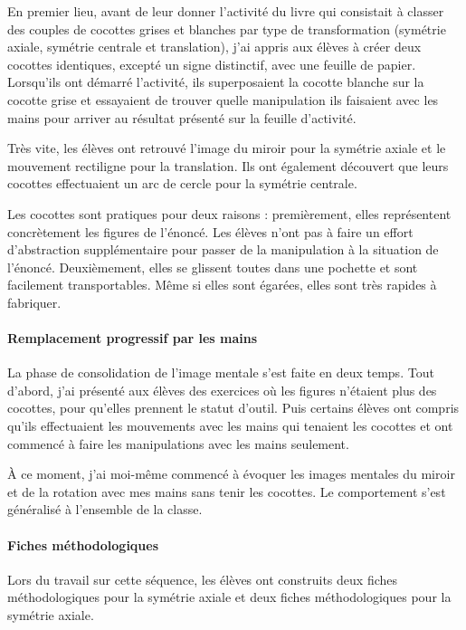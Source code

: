 En premier lieu, avant de leur donner l'activité du livre qui consistait à classer des couples de cocottes grises et blanches par type de transformation (symétrie axiale, symétrie centrale et translation), j'ai appris aux élèves à créer deux cocottes identiques, excepté un signe distinctif, avec une feuille de papier. Lorsqu'ils ont démarré l'activité, ils superposaient la cocotte blanche sur la cocotte grise et essayaient de trouver quelle manipulation ils faisaient avec les mains pour arriver au résultat présenté sur la feuille d'activité.

Très vite, les élèves ont retrouvé l'image du miroir pour la symétrie axiale et le mouvement rectiligne pour la translation. Ils ont également découvert que leurs cocottes effectuaient un arc de cercle pour la symétrie centrale.

Les cocottes sont pratiques pour deux raisons : premièrement, elles représentent concrètement les figures de l'énoncé. Les élèves n'ont pas à faire un effort d'abstraction supplémentaire pour passer de la manipulation à la situation de l'énoncé. Deuxièmement, elles se glissent toutes dans une pochette et sont facilement transportables. Même si elles sont égarées, elles sont très rapides à fabriquer.

\paragraph{Remplacement progressif par les mains}

La phase de consolidation de l'image mentale s'est faite en deux temps. Tout d'abord, j'ai présenté aux élèves des exercices où les figures n'étaient plus des cocottes, pour qu'elles prennent le statut d'outil. Puis certains élèves ont compris qu'ils effectuaient les mouvements avec les mains qui tenaient les cocottes et ont commencé à faire les manipulations avec les mains seulement.

À ce moment, j'ai moi-même commencé à évoquer les images mentales du miroir et de la rotation avec mes mains sans tenir les cocottes. Le comportement s'est généralisé à l'ensemble de la classe.

\paragraph{Fiches méthodologiques}

Lors du travail sur cette séquence, les élèves ont construits deux fiches méthodologiques pour la symétrie axiale et deux fiches méthodologiques pour la symétrie axiale.

